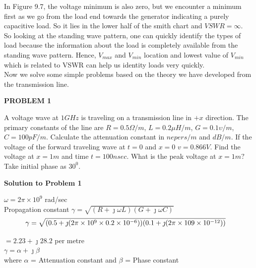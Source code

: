 In Figure 9.7, the voltage minimum is also zero, but we encounter a minimum first as we go from the load end towards the generator indicating a purely capacitive load. So it lies in the lower half of the smith chart and $VSWR=\infty$.\\

So looking at the standing wave pattern, one can quickly identify the types of load because the information about the load is completely available from the standing wave pattern. Hence, ${V_{max}}$ and ${V_{min}}$ location and lowest value of ${V_{min}}$ which is related to VSWR can help us identity loads very quickly.\\

Now we solve some simple problems based on the theory we have developed from the transmission line.\\

\begin{center}
\textbf{PROBLEM 1}
\end{center}

A voltage wave at ${1GH}z$ is traveling on a transmission line in ${+x}$ direction. The primary constants of the line are ${R=0.5\Omega/m}$, ${L=0.2\mu H/m}$, ${G=0.1\upsilon/m}$, ${C=100pF/m}$. Calculate the attenuation constant in ${nepers/m}$ and ${dB/m}$. If the voltage of the forward traveling wave at ${t=0}$ and ${x=0}$ ${v}=0.866V$. Find the voltage at ${x=1m}$ and time ${t=100nsec}$. What is the peak voltage at ${x=1m?}$ Take initial phase as ${30^0}$.


\begin{center}
\textbf{Solution to Problem 1}
\end{center}
$ \omega = 2\pi\times 10^{9} $ rad/sec\\
Propagation constant $\gamma = \sqrt{(R + \jmath\omega L)(G + \jmath\omega C)}$
\begin{dmath*}
\gamma=\\
 \sqrt{(0.5 + \jmath( 2\pi\times 10^{9} \times 0.2\times 10^{-6}))(0.1 + \jmath (2\pi\times 10{9} \times 10^{-12}))} \quad
\end{dmath*}

$ = 2.23 + \jmath 28.2$ per metre\\ 
$\gamma = \alpha + \jmath\beta$\\
where $\alpha$ = Attenuation constant and $\beta$ = Phase constant\\

